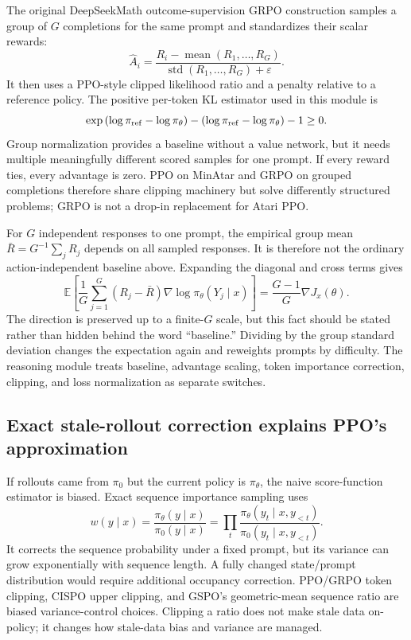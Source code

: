 \documentclass[11pt]{article}
\newcommand{\E}{\mathbb E}
\begin{document}
The original DeepSeekMath outcome-supervision GRPO construction samples a group
of $G$ completions for the same prompt and standardizes their scalar rewards:
\begin{equation}
\hat A_i=\frac{R_i-\operatorname{mean}(R_1,\ldots,R_G)}
{\operatorname{std}(R_1,\ldots,R_G)+\varepsilon}.
\end{equation}
It then uses a PPO-style clipped likelihood ratio and a penalty relative to a
reference policy. The positive per-token KL estimator used in this module is
\begin{equation}
\exp\left(\log\pi_{\rm ref}-\log\pi_\theta\right)
-\left(\log\pi_{\rm ref}-\log\pi_\theta\right)-1\geq0.
\end{equation}
Group normalization provides a baseline without a value network, but it needs
multiple meaningfully different scored samples for one prompt. If every reward
ties, every advantage is zero. PPO on MinAtar and GRPO on grouped completions
therefore share clipping machinery but solve differently structured problems;
GRPO is not a drop-in replacement for Atari PPO.

For $G$ independent responses to one prompt, the empirical group mean
$\bar R=G^{-1}\sum_jR_j$ depends on all sampled responses.  It is therefore not
the ordinary action-independent baseline above.  Expanding the diagonal and
cross terms gives
\[
\E\left[\frac1G\sum_{j=1}^{G}(R_j-\bar R)
\nabla\log\pi_\theta(Y_j\mid x)\right]
=\frac{G-1}{G}\nabla J_x(\theta).
\]
The direction is preserved up to a finite-$G$ scale, but this fact should be
stated rather than hidden behind the word ``baseline.''  Dividing by the group
standard deviation changes the expectation again and reweights prompts by
difficulty.  The reasoning module treats baseline, advantage scaling, token
importance correction, clipping, and loss normalization as separate switches.

\subsection{Exact stale-rollout correction explains PPO's approximation}

If rollouts came from $\pi_0$ but the current policy is $\pi_\theta$, the naive
score-function estimator is biased.  Exact sequence importance sampling uses
\[
w(y\mid x)=\frac{\pi_\theta(y\mid x)}{\pi_0(y\mid x)}
=\prod_t\frac{\pi_\theta(y_t\mid x,y_{<t})}
{\pi_0(y_t\mid x,y_{<t})}.
\]
It corrects the sequence probability under a fixed prompt, but its variance can
grow exponentially with sequence length.  A fully changed state/prompt
distribution would require additional occupancy correction.  PPO/GRPO token
clipping, CISPO upper clipping, and GSPO's geometric-mean sequence ratio are
biased variance-control choices.  Clipping a ratio does not make stale data
on-policy; it changes how stale-data bias and variance are managed.
\end{document}
